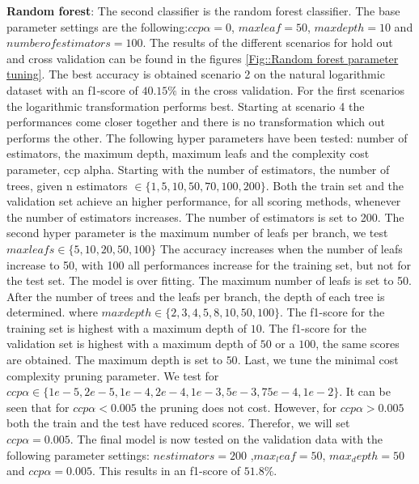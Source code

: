 \documentclass[11pt]{article}
\begin{document}
%
\newline
\textbf{Random forest}: The second classifier is the random forest classifier. The base parameter settings are the following:$ccp \alpha = 0$, $max leaf = 50$, $max depth = 10$ and
$number of estimators = 100$. The results of the different scenarios for hold out and cross validation can be found in the figures \ref{Fig::Random forest parameter tuning}. The best accuracy is obtained scenario 2 on the natural logarithmic dataset with an f1-score of $40.15\%$ in the cross validation. For the first scenarios the logarithmic transformation performs best. Starting at scenario 4 the performances come closer together and there is no transformation which out performs the other. 
\newline
The following hyper parameters have been tested: number of estimators, the maximum depth, maximum leafs and the complexity cost parameter, ccp alpha. Starting with the number of estimators, the number of trees, given n estimators $\in \{1,5,10, 50, 70, 100, 200\}$. 
\newline
Both the train set and the validation set achieve an higher performance, for all scoring methods, whenever the number of estimators increases. The number of estimators is set to 200.
\newline
The second hyper parameter is the maximum number of leafs per branch, we test $max leafs \in \{5,10, 20, 50, 100\}$ The accuracy increases when the number of leafs increase to 50, with 100 all performances increase for the training set, but not for the test set. The model is over fitting. The maximum number of leafs is set to 50.   
\newline
After the number of trees and the leafs per branch, the depth of each tree is determined. where $max depth \in \{2, 3, 4, 5, 8, 10, 50, 100\}$. The f1-score for the training set is highest with a maximum depth of $10$. The f1-score for the validation set is highest with a maximum depth of $50$ or a $100$, the same scores are obtained. The maximum depth is set to $50$. 
\newline
Last, we tune the minimal cost complexity pruning parameter. We test for $ccp  \alpha \in \{1e-5, 2e-5, 1e-4, 2e-4, 1e-3, 5e-3, 75e-4, 1e-2\}$. It can be seen that for $ccp \alpha < 0.005$ the pruning does not cost. However, for $ccp \alpha > 0.005$ both the train and the test have reduced scores. Therefor, we will set $ccp \alpha=0.005$.   
%
The final model is now tested on the validation data with the following parameter settings:
$n estimators = 200$ ,$max_leaf = 50$, $max_depth = 50$ and $ccp \alpha = 0.005$. This results in an f1-score of $51.8\%$.
\end{document}
